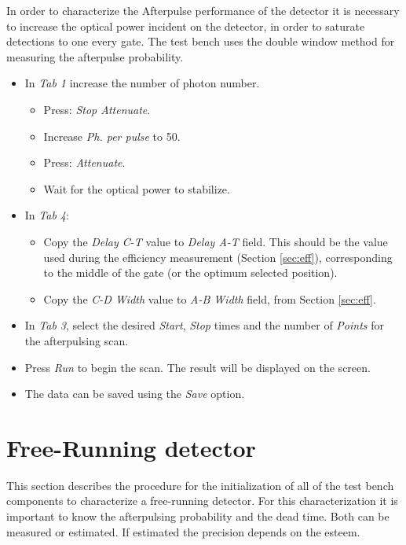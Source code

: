 \documentclass{article}
\begin{document}
In order to characterize the Afterpulse performance of the detector it is necessary to increase the optical power incident on the detector, in order to saturate detections to one every gate. The test bench uses the double window method for measuring the afterpulse probability.

\begin{itemize}
\item
In \emph{Tab 1} increase the number of photon number.
\begin{itemize}
\item
Press: \emph{Stop Attenuate}.
\item
Increase \emph{Ph. per pulse} to 50.
\item
Press: \emph{Attenuate}.
\item
Wait for the optical power to stabilize.
\end{itemize}

\item
In \emph{Tab 4}:
\begin{itemize}
\item
Copy the \emph{Delay C-T} value to \emph{Delay A-T} field. This should be the value used during the efficiency measurement (Section \ref{sec:eff}), corresponding to the middle of the gate (or the optimum selected position).
\item
Copy the \emph{C-D Width} value to \emph{A-B Width} field, from Section \ref{sec:eff}. 
\end{itemize}

\item
In \emph{Tab 3}, select the desired \emph{Start}, \emph{Stop} times and the number of \emph{Points} for the afterpulsing scan.
\item
Press \emph{Run} to begin the scan. The result will be displayed on the screen. 
\item
The data can be saved using the \emph{Save} option.

\end{itemize}

\section*{Free-Running detector}
This section describes the procedure for the initialization of all of the test bench components to characterize a free-running detector. For this characterization it is important to know the afterpulsing probability and the dead time. Both can be measured or estimated. If estimated the precision depends on the esteem.
\end{document}
